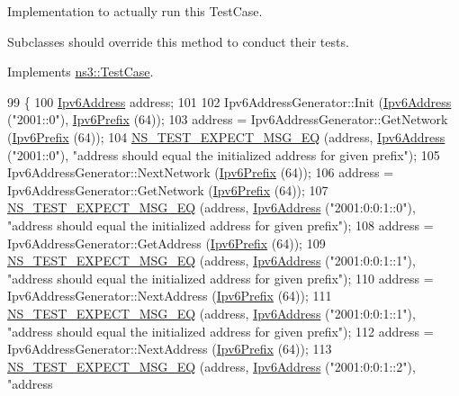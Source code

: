 Implementation to actually run this Test\+Case. 

Subclasses should override this method to conduct their tests. 

Implements \hyperlink{classns3_1_1TestCase_a8ff74680cf017ed42011e4be51917a24}{ns3\+::\+Test\+Case}.


\begin{DoxyCode}
99 \{
100   \hyperlink{classns3_1_1Ipv6Address}{Ipv6Address} address;
101 
102   Ipv6AddressGenerator::Init (\hyperlink{classns3_1_1Ipv6Address}{Ipv6Address} (\textcolor{stringliteral}{"2001::0"}), \hyperlink{classns3_1_1Ipv6Prefix}{Ipv6Prefix} (64));
103   address = Ipv6AddressGenerator::GetNetwork (\hyperlink{classns3_1_1Ipv6Prefix}{Ipv6Prefix} (64));
104   \hyperlink{group__testing_ga7304ba46a28d8cf08dfdfd6499cf7068}{NS\_TEST\_EXPECT\_MSG\_EQ} (address, \hyperlink{classns3_1_1Ipv6Address}{Ipv6Address} (\textcolor{stringliteral}{"2001::0"}), \textcolor{stringliteral}{"address should
       equal the initialized address for given prefix"});
105   Ipv6AddressGenerator::NextNetwork (\hyperlink{classns3_1_1Ipv6Prefix}{Ipv6Prefix} (64));
106   address = Ipv6AddressGenerator::GetNetwork (\hyperlink{classns3_1_1Ipv6Prefix}{Ipv6Prefix} (64));
107   \hyperlink{group__testing_ga7304ba46a28d8cf08dfdfd6499cf7068}{NS\_TEST\_EXPECT\_MSG\_EQ} (address, \hyperlink{classns3_1_1Ipv6Address}{Ipv6Address} (\textcolor{stringliteral}{"2001:0:0:1::0"}), \textcolor{stringliteral}{"address
       should equal the initialized address for given prefix"});
108   address = Ipv6AddressGenerator::GetAddress (\hyperlink{classns3_1_1Ipv6Prefix}{Ipv6Prefix} (64));
109   \hyperlink{group__testing_ga7304ba46a28d8cf08dfdfd6499cf7068}{NS\_TEST\_EXPECT\_MSG\_EQ} (address, \hyperlink{classns3_1_1Ipv6Address}{Ipv6Address} (\textcolor{stringliteral}{"2001:0:0:1::1"}), \textcolor{stringliteral}{"address
       should equal the initialized address for given prefix"});
110   address = Ipv6AddressGenerator::NextAddress (\hyperlink{classns3_1_1Ipv6Prefix}{Ipv6Prefix} (64));
111   \hyperlink{group__testing_ga7304ba46a28d8cf08dfdfd6499cf7068}{NS\_TEST\_EXPECT\_MSG\_EQ} (address, \hyperlink{classns3_1_1Ipv6Address}{Ipv6Address} (\textcolor{stringliteral}{"2001:0:0:1::1"}), \textcolor{stringliteral}{"address
       should equal the initialized address for given prefix"});
112   address = Ipv6AddressGenerator::NextAddress (\hyperlink{classns3_1_1Ipv6Prefix}{Ipv6Prefix} (64));
113   \hyperlink{group__testing_ga7304ba46a28d8cf08dfdfd6499cf7068}{NS\_TEST\_EXPECT\_MSG\_EQ} (address, \hyperlink{classns3_1_1Ipv6Address}{Ipv6Address} (\textcolor{stringliteral}{"2001:0:0:1::2"}), \textcolor{stringliteral}{"address
}
\end{DoxyCode}
